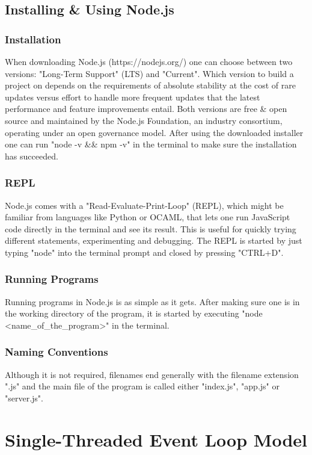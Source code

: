 \documentclass{bioinfo}
\begin{document}
\subsection{Installing \& Using Node.js}
\subsubsection{Installation}
When downloading Node.js (https://nodejs.org/) one can choose between two versions: "Long-Term Support" (LTS) and "Current". Which version to build a project on depends on the requirements of absolute stability at the cost of rare updates versus effort to handle more frequent updates that the latest performance and feature improvements entail.
Both versions are free \& open source and maintained by the Node.js Foundation, an industry consortium, operating under an open governance model. After using the downloaded installer one can run "node -v \&\& npm -v" in the terminal to make sure the installation has succeeded.

\subsubsection{REPL}
Node.js comes with a "Read-Evaluate-Print-Loop" (REPL), which might be familiar from languages like Python or OCAML, that lets one run JavaScript code directly in the terminal and see its result. This is useful for quickly trying different statements, experimenting and debugging. The REPL is started by just typing "node" into the terminal prompt and closed by pressing "CTRL+D".

\subsubsection{Running Programs}
Running programs in Node.js is as simple as it gets. After making sure one is in the working directory of the program, it is started by executing "node <name\_of\_the\_program>" in the terminal.

\subsubsection{Naming Conventions}
Although it is not required, filenames end generally with the filename extension ".js" and the main file of the program is called either "index.js", "app.js" or "server.js".

\section{Single-Threaded Event Loop Model}
\end{document}
